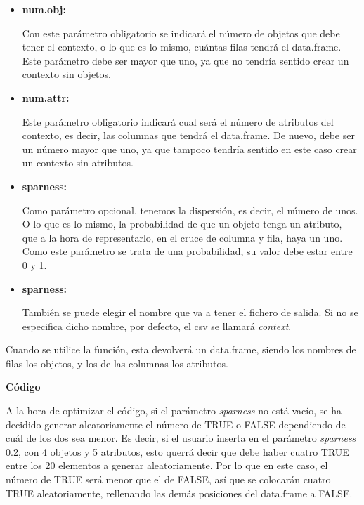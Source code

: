     \begin{itemize}
        \item \textbf{num.obj:}

        Con este par\'ametro obligatorio se indicar\'a el n\'umero de objetos que debe tener el contexto, o lo que es lo mismo, 
        cu\'antas filas tendr\'a el data.frame. Este par\'ametro debe ser mayor que uno, 
        ya que no tendr\'ia sentido crear un contexto sin objetos.


        \item \textbf{num.attr:}

        Este par\'ametro obligatorio indicar\'a cual ser\'a el n\'umero de atributos del contexto, es decir, las columnas que tendr\'a el 
        data.frame. De nuevo, debe ser un n\'umero mayor que uno, ya que tampoco tendr\'ia sentido en este caso crear un contexto sin 
        atributos.

        \item \textbf{sparness:}

        Como par\'ametro opcional, tenemos la dispersi\'on, es decir, el n\'umero de unos. O lo que es lo mismo, la probabilidad 
        de que un objeto tenga un atributo, que a la hora de representarlo, en el cruce de columna y fila, haya un uno.
        Como este par\'ametro se trata de una probabilidad, su valor debe estar entre 0 y 1.

        \item \textbf{sparness:}

        Tambi\'en se puede elegir el nombre que va a tener el fichero de salida. Si no se especifica dicho nombre, por defecto, el 
        csv se llamar\'a \textit{context}.

    \end{itemize}


    Cuando se utilice la funci\'on, esta devolver\'a un data.frame, siendo los nombres de filas los objetos, y los de las columnas 
    los atributos.


    \bigskip

    \textbf{C\'odigo}

    A la hora de optimizar el c\'odigo, si el par\'ametro \textit{sparness} no est\'a vac\'io, se ha decidido generar aleatoriamente el n\'umero de 
    TRUE o FALSE dependiendo de cu\'al de los dos sea menor. Es decir, si el usuario inserta en el par\'ametro \textit{sparness} 0.2, con 4 objetos 
    y 5 atributos, esto querr\'a decir que debe haber cuatro TRUE entre los 20 elementos a generar aleatoriamente. Por lo que en este caso, 
    el n\'umero de TRUE ser\'a menor que el de FALSE, as\'i que se colocar\'an cuatro TRUE aleatoriamente, rellenando las dem\'as posiciones 
    del data.frame a FALSE.

